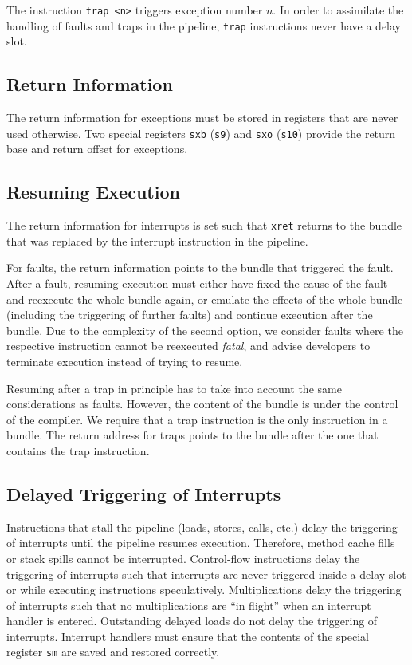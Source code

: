 \documentclass[a4paper,fontsize=10pt,twoside,DIV15,BCOR12mm,headinclude=true,footinclude=false,pagesize,bibtotoc]{scrbook}
\begin{document}
The instruction \texttt{trap <n>} triggers exception number $n$. In
order to assimilate the handling of faults and traps in the pipeline,
\texttt{trap} instructions never have a delay slot.

\subsection{Return Information}

The return information for exceptions must be stored in registers that
are never used otherwise. Two special registers \texttt{sxb}
(\texttt{s9}) and \texttt{sxo} (\texttt{s10}) provide the return base
and return offset for exceptions.

\subsection{Resuming Execution}

The return information for interrupts is set such that \texttt{xret}
returns to the bundle that was replaced by the interrupt
instruction in the pipeline.

For faults, the return information points to the bundle that triggered
the fault. After a fault, resuming execution must either have fixed
the cause of the fault and reexecute the whole bundle again, or
emulate the effects of the whole bundle (including the triggering of
further faults) and continue execution after the bundle. Due to the
complexity of the second option, we consider faults where the
respective instruction cannot be reexecuted \emph{fatal}, and advise
developers to terminate execution instead of trying to resume.

Resuming after a trap in principle has to take into account the same
considerations as faults. However, the content of the bundle is under
the control of the compiler. We require that a trap instruction is the
only instruction in a bundle. The return address for traps points to
the bundle after the one that contains the trap instruction.

\subsection{Delayed Triggering of Interrupts}

Instructions that stall the pipeline (loads, stores, calls, etc.)
delay the triggering of interrupts until the pipeline resumes
execution. Therefore, method cache fills or stack spills cannot be
interrupted. Control-flow instructions delay the triggering of
interrupts such that interrupts are never triggered inside a delay
slot or while executing instructions speculatively. Multiplications
delay the triggering of interrupts such that no multiplications are
``in flight'' when an interrupt handler is entered. Outstanding
delayed loads do not delay the triggering of interrupts. Interrupt
handlers must ensure that the contents of the special register
\texttt{sm} are saved and restored correctly.
\end{document}
